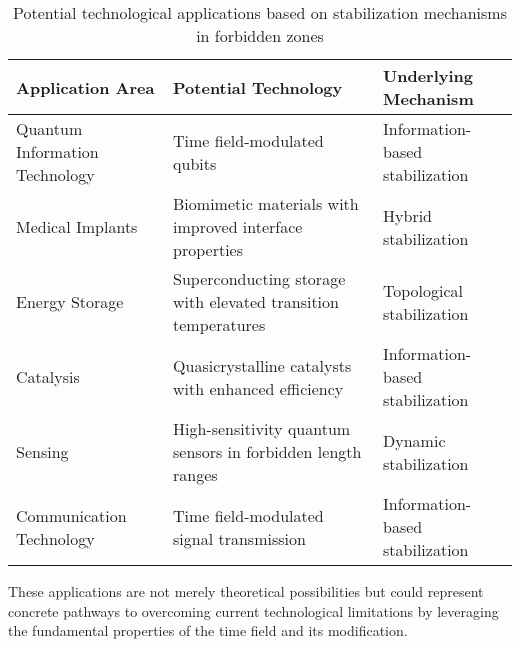 \documentclass[12pt,a4paper]{article}
\begin{document}
	\begin{table}[h]
		\centering
		\begin{adjustbox}{scale=0.65}
			\begin{tabular}{lll}
				\hline
				\textbf{Application Area} & \textbf{Potential Technology} & \textbf{Underlying Mechanism} \\
				\hline
				Quantum Information Technology & Time field-modulated qubits & Information-based stabilization \\
				Medical Implants & Biomimetic materials with improved interface properties & Hybrid stabilization \\
				Energy Storage & Superconducting storage with elevated transition temperatures & Topological stabilization \\
				Catalysis & Quasicrystalline catalysts with enhanced efficiency & Information-based stabilization \\
				Sensing & High-sensitivity quantum sensors in forbidden length ranges & Dynamic stabilization \\
				Communication Technology & Time field-modulated signal transmission & Information-based stabilization \\
				\hline
			\end{tabular}
		\end{adjustbox}
		\caption{Potential technological applications based on stabilization mechanisms in forbidden zones}
		\label{tab:applications}
	\end{table}
	
	These applications are not merely theoretical possibilities but could represent concrete pathways to overcoming current technological limitations by leveraging the fundamental properties of the time field and its modification.
	
\end{document}
